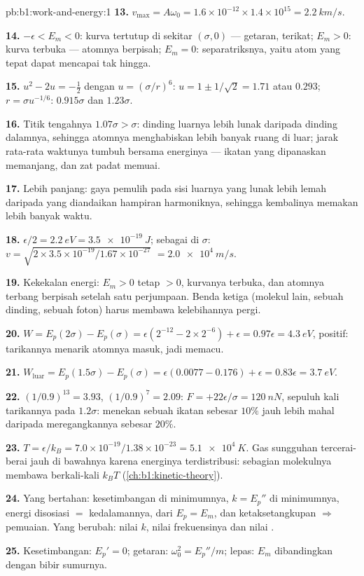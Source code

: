 \begin{solution}{pb:b1:work-and-energy:1}
\textbf{13.} $v_{\max} = A\omega_0 = 1.6\times10^{-12} \times 1.4\times10^{15}
= \qty{2.2}{km/s}$.

\textbf{14.} $-\epsilon < E_m < 0$: kurva tertutup di sekitar $(\sigma, 0)$ ---
getaran, terikat; $E_m > 0$: kurva terbuka --- atomnya berpisah;
$E_m = 0$: separatriksnya, yaitu atom yang tepat dapat mencapai tak hingga.

\textbf{15.} $u^2 - 2u = -\tfrac12$ dengan $u = (\sigma/r)^6$: $u = 1 \pm 1/\sqrt2
= 1.71$ atau $0.293$; $r = \sigma u^{-1/6}$: $0.915\sigma$ dan $1.23\sigma$.

\textbf{16.} Titik tengahnya $1.07\sigma > \sigma$: dinding luarnya lebih
lunak daripada dinding dalamnya, sehingga atomnya menghabiskan lebih
banyak ruang di luar; jarak rata-rata waktunya tumbuh bersama energinya
--- ikatan yang dipanaskan memanjang, dan zat padat memuai.

\textbf{17.} Lebih panjang: gaya pemulih pada sisi luarnya yang lunak
lebih lemah daripada yang diandaikan hampiran harmoniknya, sehingga
kembalinya memakan lebih banyak waktu.

\textbf{18.} $\epsilon/2 = \qty{2.2}{eV} = \qty{3.5e-19}{J}$; sebagai  di $\sigma$: $v = \sqrt{2 \times 3.5\times10^{-19}/1.67\times10^{-27}}$
$= \qty{2.0e4}{m/s}$.

\textbf{19.} Kekekalan energi: $E_m > 0$ tetap $> 0$, kurvanya terbuka,
dan atomnya terbang berpisah setelah satu perjumpaan. Benda ketiga
(molekul lain, sebuah dinding, sebuah foton) harus membawa kelebihannya pergi.

\textbf{20.} $W = E_p(2\sigma) - E_p(\sigma) = \epsilon(2^{-12} - 2 \times 2^{-6})
+ \epsilon = 0.97\epsilon = \qty{4.3}{eV}$, positif: tarikannya menarik
atomnya masuk, jadi memacu.

\textbf{21.} $W_{\text{luar}} = E_p(1.5\sigma) - E_p(\sigma) = \epsilon(0.0077 -
0.176) + \epsilon = 0.83\epsilon = \qty{3.7}{eV}$.

\textbf{22.} $(1/0.9)^{13} = 3.93$, $(1/0.9)^7 = 2.09$: $F = +22\epsilon/\sigma
= \qty{+120}{nN}$, sepuluh kali tarikannya pada $1.2\sigma$: menekan
sebuah ikatan sebesar $10\%$ jauh lebih mahal daripada meregangkannya sebesar $20\%$.

\textbf{23.} $T = \epsilon/k_B = 7.0\times10^{-19}/1.38\times10^{-23} =
\qty{5.1e4}{K}$. Gas sungguhan tercerai-berai jauh di bawahnya karena
energinya terdistribusi: sebagian molekulnya membawa berkali-kali $k_BT$
(\cref{ch:b1:kinetic-theory}).

\textbf{24.} Yang bertahan: kesetimbangan di minimumnya, $k = E_p''$ di
minimumnya, energi disosiasi $=$ kedalamannya,  dari
$E_p = E_m$, dan ketaksetangkupan $\Rightarrow$ pemuaian. Yang berubah:
nilai $k$, nilai frekuensinya dan nilai .

\textbf{25.} Kesetimbangan: $E_p' = 0$; getaran: $\omega_0^2 = E_p''/m$;
lepas: $E_m$ dibandingkan dengan bibir sumurnya.
\end{solution}
